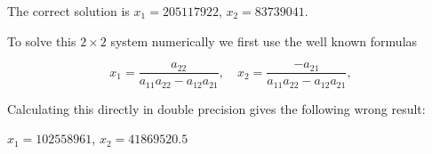 The correct solution is $x_1 = 205117922$, $x_2 = 83739041$.

To solve this $2 \times 2$ system numerically we first use the well known formulas

\begin{equation}
x_1 = \frac{a_{22}}{a_{11}a_{22} - a_{12}a_{21}}, \quad x_2 = \frac{-a_{21}}{a_{11}a_{22} - a_{12}a_{21}},
\end{equation}

Calculating this directly in double precision gives the following wrong result:  

$x_1 = 102558961$, $x_2 = 41869520.5$

%


%
%
%
%
%
%
%
%
%

%
%
%
%
%





